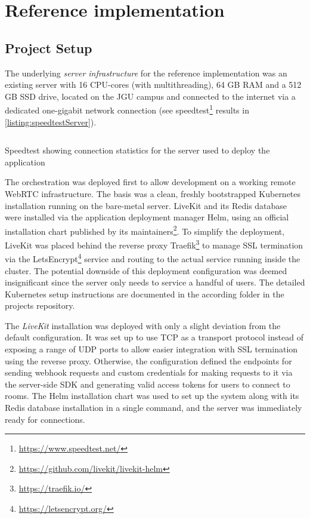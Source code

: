 \chapter{Reference implementation}
\label{ch:implementation}

\section{Project Setup}
\label{sec:project-setup}

The underlying \emph{server infrastructure} for the reference implementation was an existing server with 16 \ac{CPU}-cores (with multithreading), 64 \ac{GB} \ac{RAM} and a 512 \ac{GB} \ac{SSD} drive, located on the \ac{JGU} campus and connected to the internet via a dedicated one-gigabit network connection (see speedtest\footnote{\url{https://www.speedtest.net/}} results in \autoref{listing:speedtestServer}).

\begin{listing}[!ht]
\inputminted{text}{04_Artefakte/03_Listings/speedtest-server.txt}
\caption{Speedtest showing connection statistics for the server used to deploy the application\protect}
\label{listing:speedtestServer}
\end{listing}

The orchestration was deployed first to allow development on a working remote WebRTC infrastructure.
The basis was a clean, freshly bootstrapped Kubernetes installation running on the bare-metal server.
LiveKit and its Redis database were installed via the application deployment manager Helm, using an official installation chart published by its maintainers\footnote{\url{https://github.com/livekit/livekit-helm}}.
To simplify the deployment, LiveKit was placed behind the reverse proxy Traefik\footnote{\url{https://traefik.io/}} to manage \ac{SSL} termination via the LetsEncrypt\footnote{\url{https://letsencrypt.org/}} service and routing to the actual service running inside the cluster.
The potential downside of this deployment configuration was deemed insignificant since the server only needs to service a handful of users.
The detailed Kubernetes setup instructions are documented in the according folder in the project\textquotesingle s repository.

The \emph{LiveKit} installation was deployed with only a slight deviation from the default configuration.
It was set up to use \ac{TCP} as a transport protocol instead of exposing a range of UDP ports to allow easier integration with \ac{SSL} termination using the reverse proxy.
Otherwise, the configuration defined the endpoints for sending webhook requests and custom credentials for making requests to it via the server-side \ac{SDK} and generating valid access tokens for users to connect to rooms.
The Helm installation chart was used to set up the system along with its Redis database installation in a single command, and the server was immediately ready for connections.

